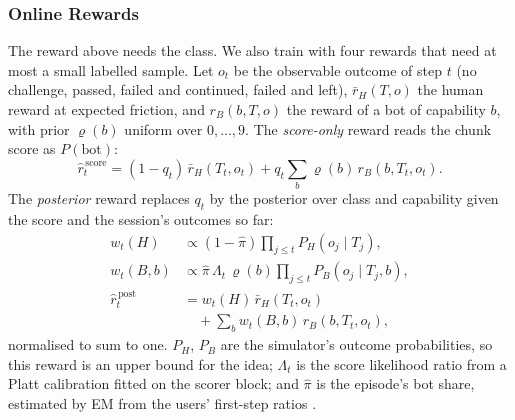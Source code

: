 \documentclass{ieeetj}
\begin{document}
\subsubsection{Online Rewards}
The reward above needs the class. We also train with four rewards that need at most a small labelled sample. Let $o_t$ be the observable outcome of step $t$ (no challenge, passed, failed and continued, failed and left), $\bar r_H(T,o)$ the human reward at expected friction, and $r_B(b,T,o)$ the reward of a bot of capability $b$, with prior $\varrho(b)$ uniform over $0,\dots,9$. The \emph{score-only} reward reads the chunk score as $P(\text{bot})$:
\begin{equation}
\hat r^{\,\text{score}}_t=(1-q_t)\,\bar r_H(T_t,o_t)+q_t\textstyle\sum_b\varrho(b)\,r_B(b,T_t,o_t).
\label{eq:scoreonly}
\end{equation}
The \emph{posterior} reward replaces $q_t$ by the posterior over class and capability given the score and the session's outcomes so far:
\begin{equation}
\begin{aligned}
w_t(H)&\propto(1-\hat\pi)\textstyle\prod_{j\le t}P_H(o_j\mid T_j),\\
w_t(B,b)&\propto\hat\pi\,\Lambda_t\,\varrho(b)\textstyle\prod_{j\le t}P_B(o_j\mid T_j,b),\\
\hat r^{\,\text{post}}_t&=w_t(H)\,\bar r_H(T_t,o_t)\\
&\quad+\textstyle\sum_b w_t(B,b)\,r_B(b,T_t,o_t),
\end{aligned}
\label{eq:posterior}
\end{equation}
normalised to sum to one. $P_H$, $P_B$ are the simulator's outcome probabilities, so this reward is an upper bound for the idea; $\Lambda_t$ is the score likelihood ratio from a Platt calibration \cite{platt_1999} fitted on the scorer block; and $\hat\pi$ is the episode's bot share, estimated by EM from the users' first-step ratios \cite{saerens_2002}.
\end{document}
